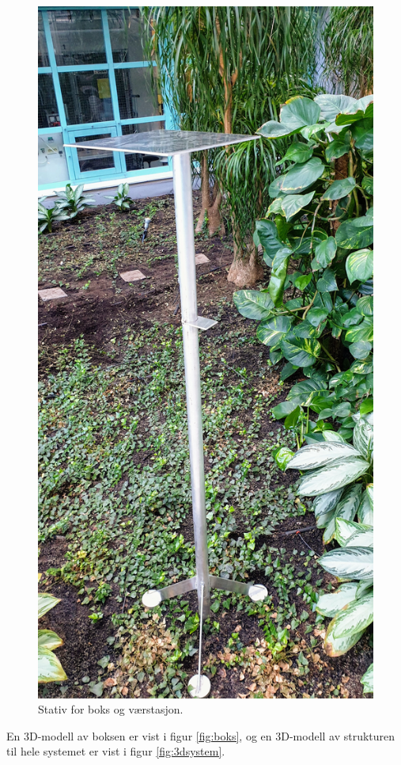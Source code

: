 \begin{figure}[!htbp]
    \centering
    \includegraphics[trim={0 0 0 20cm}, clip, width=.5\textwidth]{implementering/Stativ.jpg}
    \caption{Stativ for boks og værstasjon.}
    \label{fig:Stativ}
\end{figure}

En 3D-modell av boksen er vist i figur \ref{fig:boks}, og en 3D-modell av strukturen til hele systemet er vist i figur \ref{fig:3dsystem}.

